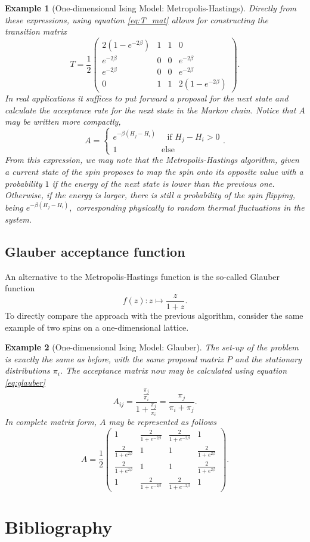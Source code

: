 \documentclass[]{article}
\numberwithin{equation}{section}
\theoremstyle{break}
\newtheorem*{example}{Example}
\begin{document}
\begin{example}[One-dimensional Ising Model: Metropolis-Hastings]
    Directly from these expressions, using equation \eqref{eq:T_mat} allows for constructing the transition matrix
    \[T = \frac{1}{2}\begin{pmatrix}
        2(1-e^{-2\beta}) & 1 & 1 & 0 \\
        e^{-2\beta} & 0 & 0 & e^{-2\beta} \\
        e^{-2\beta} & 0 & 0 & e^{-2\beta} \\
        0 & 1 & 1 & 2(1-e^{-2\beta})
    \end{pmatrix}.\]
    In real applications it suffices to put forward a proposal for the next state and calculate the acceptance rate for the next state in the Markov chain. Notice that $A$ may be written more compactly,
    \[A = \begin{cases}
        e^{-\beta(H_j- H_i)} \quad \text{ if } H_j - H_i > 0 \\
        1\quad\quad\quad\quad\quad \text{ else}
    \end{cases}.\]
    From this expression, we may note that the Metropolis-Hastings algorithm, given a current state of the spin proposes to map the spin onto its opposite value with a probability $1$ if the energy of the next state is lower than the previous one. Otherwise, if the energy is larger, there is still a probability of the spin flipping, being $e^{-\beta(H_j - H_i)},$ corresponding physically to random thermal fluctuations in the system.
\end{example}
\subsection{Glauber acceptance function}
An alternative to the Metropolis-Hastings function is the so-called Glauber function
\begin{equation}
f(z): z \mapsto \frac{z}{1+z}.
\label{eq:glauber}
\end{equation}
To directly compare the approach with the previous algorithm, consider the same example of two spins on a one-dimensional lattice.
\begin{example}[One-dimensional Ising Model: Glauber]
The set-up of the problem is exactly the same as before, with the same proposal matrix $P$ and the stationary distributions $\pi_i$. The acceptance matrix now may be calculated using equation \eqref{eq:glauber}
\[A_{ij} = \frac{\frac{\pi_j}{\pi_i}}{1 + \frac{\pi_j}{\pi_i}} = \frac{\pi_j}{\pi_i + \pi_j}.\]
In complete matrix form, $A$ may be represented as follows
\[A = \frac{1}{2}\begin{pmatrix}
    1 & \frac{2}{1+e^{-2\beta}} & \frac{2}{1+e^{-2\beta}} & 1 \\
    \frac{2}{1+e^{2\beta}} & 1 & 1 & \frac{2}{1+e^{2\beta}} \\
    \frac{2}{1+e^{2\beta}} & 1 & 1 & \frac{2}{1+e^{2\beta}} \\
    1 & \frac{2}{1+e^{-2\beta}} & \frac{2}{1+e^{-2\beta}} & 1
\end{pmatrix}.\]
\end{example}
\newpage
\section*{Bibliography}
\printbibliography[heading=none]
\end{document}
